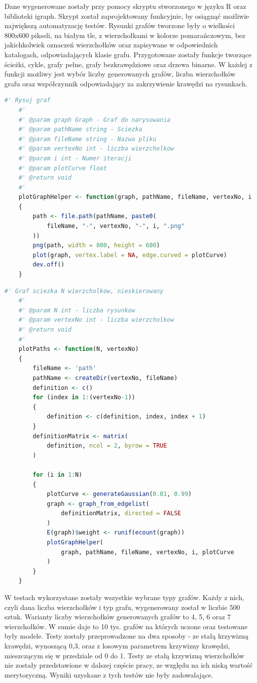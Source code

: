 Dane wygenerowane zostały przy pomocy skryptu stworzonego w języku R oraz biblioteki igraph.
Skrypt został zaprojektowany funkcyjnie, by osiągnąć możliwie największą automatyzację testów.
Rysunki grafów tworzone były o wielkości 800x600 pikseli, na białym tle, z wierzchołkami w kolorze pomarańczowym,
bez jakichkolwiek oznaczeń wierzchołków oraz zapisywane w odpowiednich katalogach, odpowiadających klasie grafu.
Przygotowane zostały funkcje tworzące ścieżki, cykle, grafy pełne, grafy bezkrawędziowe oraz drzewa binarne.
W każdej z funkcji możliwy jest wybór liczby generowanych grafów, liczba wierzchołków grafu
oraz współczynnik odpowiadający za zakrzywienie krawędzi na rysunkach.

\begin{lstlisting}[language=R,caption=Listing skryptu rysującego grafy,label={tests-generation-1}]
	#' Rysuj graf
	#'
	#' @param graph Graph - Graf do narysowania
	#' @param pathName string - Sciezka
	#' @param fileName string - Nazwa pliku
	#' @param vertexNo int - liczba wierzcholkow
	#' @param i int - Numer iteracji
	#' @param plotCurve float
	#' @return void
	#'
	plotGraphHelper <- function(graph, pathName, fileName, vertexNo, i, plotCurve)
	{
		path <- file.path(pathName, paste0(
			fileName, "-", vertexNo, "-", i, ".png"
		))
		png(path, width = 800, height = 600)
		plot(graph, vertex.label = NA, edge.curved = plotCurve)
		dev.off()
	}	
\end{lstlisting}

\begin{lstlisting}[language=R,caption=Listing funkcji tworzącej ścieżkę,label={tests-generation-2}]
	#' Graf sciezka N wierzcholkow, nieskierowany
	#'
	#' @param N int - liczba rysunkow
	#' @param vertexNo int - liczba wierzcholkow
	#' @return void
	#'
	plotPaths <- function(N, vertexNo)
	{
		fileName <- 'path'
		pathName <- createDir(vertexNo, fileName)
		definition <- c()
		for (index in 1:(vertexNo-1))
		{
			definition <- c(definition, index, index + 1)
		}
		definitionMatrix <- matrix(
			definition, ncol = 2, byrow = TRUE
		)
		
		for (i in 1:N)
		{
			plotCurve <- generateGaussian(0.01, 0.99)
			graph <- graph_from_edgelist(
				definitionMatrix, directed = FALSE
			)
			E(graph)$weight <- runif(ecount(graph))
			plotGraphHelper(
				graph, pathName, fileName, vertexNo, i, plotCurve
			)
		}
	}
\end{lstlisting}

W testach wykorzystane zostały wszystkie wybrane typy grafów.
Każdy z nich, czyli dana liczba wierzchołków i typ grafu, wygenerowany został w liczbie 500 sztuk.
Warianty liczby wierzchołków generowanych grafów to 4, 5, 6 oraz 7 wierzchołków.
W sumie daje to 10 tys. grafów na których uczone oraz testowane były modele.
Testy zostały przeprowadzone na dwa sposoby - ze stałą krzywizną krawędzi, wynoszącą 0,3,
oraz z losowym parametrem krzywizny krawędzi, mieszczącym się w przedziale od 0 do 1.
Testy ze stałą krzywizną wierzchołków nie zostały przedstawione w dalszej częście pracy,
ze względu na ich niską wartość merytoryczną. Wyniki uzyskane z tych testów nie były zadowalające.

